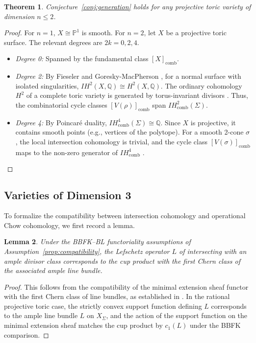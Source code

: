 \documentclass[12pt,reqno]{amsart}
\theoremstyle{plain}
\newtheorem{theorem}{Theorem}[section]
\newtheorem{lemma}[theorem]{Lemma}
\theoremstyle{definition}
\newcommand{\IQ}{\mathbb{Q}}
\newcommand{\IP}{\mathbb{P}}
\newcommand{\IHcomb}{IH_{\mathrm{comb}}}
\begin{document}
	\begin{theorem}
		Conjecture~\ref{conj:generation} holds for any projective toric variety of dimension $n \le 2$.
	\end{theorem}
	\begin{proof}
		For $n=1$, $X \cong \IP^1$ is smooth. For $n=2$, let $X$ be a projective toric surface. The relevant degrees are $2k = 0, 2, 4$.
		\begin{itemize}
			\item \emph{Degree 0:} Spanned by the fundamental class $[X]_{\mathrm{comb}}$.
			\item \emph{Degree 2:} By Fieseler \cite[Thm.~1.1]{Fieseler91} and Goresky-MacPherson \cite[6.2]{GM80}, for a normal surface with isolated singularities, $IH^2(X, \IQ) \cong H^2(X, \IQ)$. The ordinary cohomology $H^2$ of a complete toric variety is generated by torus-invariant divisors \cite[Section 3.4]{Fulton}. Thus, the combinatorial cycle classes $[V(\rho)]_{\mathrm{comb}}$ span $\IHcomb^2(\Sigma)$.
			\item \emph{Degree 4:} By Poincar\'e duality, $\IHcomb^4(\Sigma) \cong \IQ$. Since $X$ is projective, it contains smooth points (e.g., vertices of the polytope). For a smooth 2-cone $\sigma$, the local intersection cohomology is trivial, and the cycle class $[V(\sigma)]_{\mathrm{comb}}$ maps to the non-zero generator of $\IHcomb^4$ \cite{BBFK}.
		\end{itemize}
	\end{proof}
	
	\subsection{Varieties of Dimension 3}
	
	To formalize the compatibility between intersection cohomology and operational Chow cohomology, we first record a lemma.
	
	\begin{lemma}
		\label{lem:chern_class_compatibility}
		Under the BBFK--BL functoriality assumptions of Assumption~\ref{prop:compatibility}, the Lefschetz operator $L$ of intersecting with an ample divisor class corresponds to the cup product with the first Chern class of the associated ample line bundle.
	\end{lemma}
	\begin{proof}
		This follows from the compatibility of the minimal extension sheaf functor with the first Chern class of line bundles, as established in \cite[Theorem 5.2]{BL}. In the rational projective toric case, the strictly convex support function defining $L$ corresponds to the ample line bundle $L$ on $X_\Sigma$, and the action of the support function on the minimal extension sheaf matches the cup product by $c_1(L)$ under the BBFK comparison.
	\end{proof}
	
\end{document}
